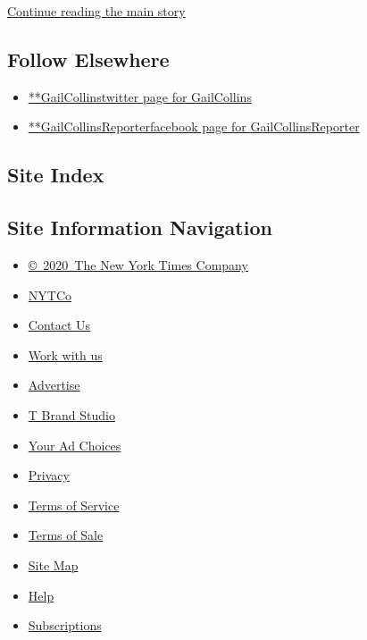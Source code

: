 \protect\hyperlink{after-mid2}{Continue reading the main story}

\hypertarget{follow-elsewhere}{%
\subsection{Follow Elsewhere}\label{follow-elsewhere}}

\begin{itemize}
\tightlist
\item
  \href{https://twitter.com/GailCollins}{**GailCollinstwitter page for
  GailCollins}
\item
  \href{https://www.facebook.com/GailCollinsReporter}{**GailCollinsReporterfacebook
  page for GailCollinsReporter}
\end{itemize}

\hypertarget{site-index}{%
\subsection{Site Index}\label{site-index}}

\hypertarget{site-information-navigation}{%
\subsection{Site Information
Navigation}\label{site-information-navigation}}

\begin{itemize}
\tightlist
\item
  \href{https://help.nytimes.com/hc/en-us/articles/115014792127-Copyright-notice}{©~2020~The
  New York Times Company}
\end{itemize}

\begin{itemize}
\tightlist
\item
  \href{https://www.nytco.com/}{NYTCo}
\item
  \href{https://help.nytimes.com/hc/en-us/articles/115015385887-Contact-Us}{Contact
  Us}
\item
  \href{https://www.nytco.com/careers/}{Work with us}
\item
  \href{https://nytmediakit.com/}{Advertise}
\item
  \href{http://www.tbrandstudio.com/}{T Brand Studio}
\item
  \href{https://www.nytimes.com/privacy/cookie-policy\#how-do-i-manage-trackers}{Your
  Ad Choices}
\item
  \href{https://www.nytimes.com/privacy}{Privacy}
\item
  \href{https://help.nytimes.com/hc/en-us/articles/115014893428-Terms-of-service}{Terms
  of Service}
\item
  \href{https://help.nytimes.com/hc/en-us/articles/115014893968-Terms-of-sale}{Terms
  of Sale}
\item
  \href{https://spiderbites.nytimes.com}{Site Map}
\item
  \href{https://help.nytimes.com/hc/en-us}{Help}
\item
  \href{https://www.nytimes.com/subscription?campaignId=37WXW}{Subscriptions}
\end{itemize}
